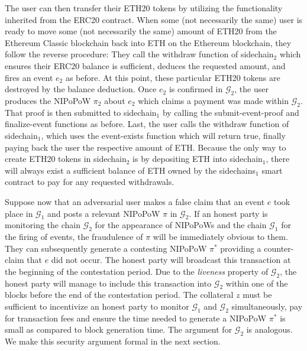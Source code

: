 The user can then transfer their ETH20 tokens by utilizing the functionality
inherited from the \textsf{ERC20} contract.  When some (not necessarily the
same) user is ready to move some (not necessarily the same) amount of ETH20 from
the Ethereum Classic blockchain back into ETH on the Ethereum blockchain, they
follow the reverse procedure: They call the \textsf{withdraw}
function of \textsf{sidechain}$_2$ which ensures their ERC20 balance is
sufficient, deduces the requested amount, and fires an event $e_2$ as before. At
this point, these particular ETH20 tokens are destroyed by the balance
deduction. Once $e_2$ is confirmed in $\mathcal{G}_2$, the user produces the
NIPoPoW $\pi_2$ about $e_2$ which claims a payment was made within
$\mathcal{G}_2$. That proof is then submitted to \textsf{sidechain}$_1$ by
calling the \textsf{submit-event-proof} and \textsf{finalize-event} functions as
before. Last, the user calls the \textsf{withdraw} function of
\textsf{sidechain}$_1$, which uses the \textsf{event-exists} function which will
return \textsf{true}, finally paying back the user the respective amount of ETH.
Because the only way to create ETH20 tokens in \textsf{sidechain}$_2$ is by
depositing ETH into \textsf{sidechain}$_1$, there will always exist a sufficient
balance of ETH owned by the \textsf{sidechains}$_1$ smart contract to pay for
any requested withdrawals.

Suppose now that an adversarial user makes a false claim that an event $e$ took
place in $\mathcal{G}_1$ and posts a relevant NIPoPoW $\pi$ in $\mathcal{G}_2$.
If an honest party is monitoring the chain $\mathcal{G}_2$ for the appearance of
NIPoPoWs and the chain $\mathcal{G}_1$ for the firing of events, the fraudulence
of $\pi$ will be immediately obvious to them. They can subsequently generate a
contesting NIPoPoW $\pi^*$ providing a counter-claim that $e$ did not occur. The
honest party will broadcast this transaction at the beginning of the
contestation period. Due to the \emph{liveness} property of $\mathcal{G}_2$, the
honest party will manage to include this transaction into $\mathcal{G}_2$ within
one of the blocks before the end of the contestation period. The collateral $z$
must be sufficient to incentivize an honest party to monitor $\mathcal{G}_1$ and
$\mathcal{G}_2$ simultaneously, pay for transaction fees and ensure the time
needed to generate a NIPoPoW $\pi^*$ is small as compared to block generation
time. The argument for $\mathcal{G}_2$ is analogous.
We make this security argument formal in the next section.

